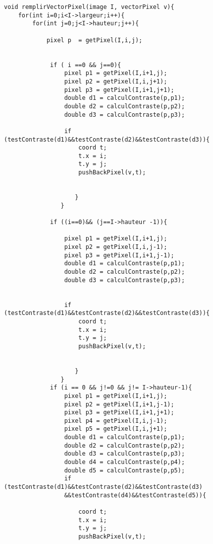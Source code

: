 \documentclass[a4paper , 10pt]{article}
\begin{document}
\begin{verbatim}
void remplirVectorPixel(image I, vectorPixel v){
	for(int i=0;i<I->largeur;i++){
     	for(int j=0;j<I->hauteur;j++){
       
         	pixel p  = getPixel(I,i,j);


             if ( i ==0 && j==0){
                 pixel p1 = getPixel(I,i+1,j);
        	     pixel p2 = getPixel(I,i,j+1);
        	     pixel p3 = getPixel(I,i+1,j+1);
        	     double d1 = calculContraste(p,p1);
	             double d2 = calculContraste(p,p2);
	             double d3 = calculContraste(p,p3);

        	     if (testContraste(d1)&&testContraste(d2)&&testContraste(d3)){
                     coord t;
                     t.x = i;
	                 t.y = j;
	                 pushBackPixel(v,t);
	                 
	                 
        	        }
                }

             if ((i==0)&& (j==I->hauteur -1)){

                 pixel p1 = getPixel(I,i+1,j);
                 pixel p2 = getPixel(I,i,j-1);
        	     pixel p3 = getPixel(I,i+1,j-1);
        	     double d1 = calculContraste(p,p1);
	             double d2 = calculContraste(p,p2);
	             double d3 = calculContraste(p,p3);


        	     if (testContraste(d1)&&testContraste(d2)&&testContraste(d3)){
                     coord t;
                     t.x = i;
	                 t.y = j;
	                 pushBackPixel(v,t);
	                 
	                        	
        	        }
                }
             if (i == 0 && j!=0 && j!= I->hauteur-1){
                 pixel p1 = getPixel(I,i+1,j);
        	     pixel p2 = getPixel(I,i+1,j-1);
        	     pixel p3 = getPixel(I,i+1,j+1);
        	     pixel p4 = getPixel(I,i,j-1);
        	     pixel p5 = getPixel(I,i,j+1);
                 double d1 = calculContraste(p,p1);
	             double d2 = calculContraste(p,p2);
	             double d3 = calculContraste(p,p3);
	             double d4 = calculContraste(p,p4);
	             double d5 = calculContraste(p,p5);
                 if (testContraste(d1)&&testContraste(d2)&&testContraste(d3)
                 &&testContraste(d4)&&testContraste(d5)){
                     
                     coord t;
                     t.x = i;
	                 t.y = j;
	                 pushBackPixel(v,t);
	                 

\end{verbatim}
\end{document}
